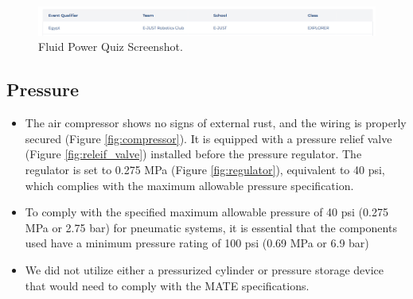 \documentclass[11pt, twocolumn]{article}
\begin{document}
\begin{figure}[ht!]
    \centering
    \includegraphics[width=\columnwidth]{Images/QUIZ (1).png}
    \caption{Fluid Power Quiz Screenshot.}
    \label{fig:quiz}
\end{figure}

\subsection{Pressure}

\begin{itemize}[leftmargin=0pt, itemindent=10pt]
    \setlength{\itemsep}{0pt}
    \item The air compressor shows no signs of external rust, and the wiring is properly secured (Figure \ref{fig:compressor}). It is equipped with a pressure relief valve (Figure \ref{fig:releif_valve}) installed before the pressure regulator. The regulator is set to 0.275 MPa (Figure \ref{fig:regulator}), equivalent to 40 psi, which complies with the maximum allowable pressure specification.
    \item To comply with the specified maximum allowable pressure of 40 psi (0.275 MPa or 2.75 bar) for pneumatic systems, it is essential that the components used have a minimum pressure rating of 100 psi (0.69 MPa or 6.9 bar)
    \item We did not utilize either a pressurized cylinder or pressure storage device that would need to comply with the MATE specifications.


\end{itemize}
\end{document}
